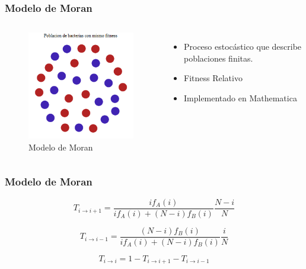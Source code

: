 \documentclass{beamer}
\begin{document}
\begin{frame}
\begin{columns}[c]
\end{columns}
\end{frame}


\begin{frame}
\frametitle{Modelo de Moran}
\begin{columns}[c] %
\begin{figure}[ht!]
\vspace*{-1cm}
\includegraphics[scale=0.5]{same_fitness.png} 
\caption{Modelo de Moran}
\end{figure} 
\begin{itemize}
\item Proceso estocástico que describe poblaciones finitas.
\item Fitness Relativo
\item Implementado en Mathematica
\end{itemize}
\end{columns}
\end{frame}


\begin{frame}
\frametitle{Modelo de Moran}
\[ T_{i \rightarrow i+1}= \frac{i f_{A} \left(i\right)}{i f_{A}\left(i\right)+ \left(N-i\right) f_{B}\left(i\right)} \frac{N-i}{N}\]

\[ T_{i \rightarrow i-1}= \frac{\left( N-i \right) f_{B} \left(i\right) }{i f_{A}\left(i\right)+ \left(N-i\right) f_{B}\left(i\right)} \frac{i}{N}\]

\[ T_{i \rightarrow i}= 1 - T_{i \rightarrow i+1} - T_{i \rightarrow i-1} \]
\end{frame}
\end{document}
